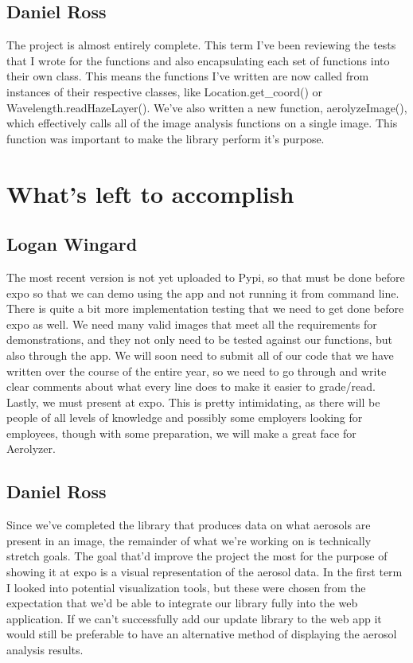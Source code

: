 \documentclass[onecolumn, draftclsnofoot,10pt, compsoc]{IEEEtran}
\begin{document}
\begin{singlespace}
		\subsection{Daniel Ross}
			The project is almost entirely complete.
			This term I've been reviewing the tests that I wrote for the functions and also encapsulating each set of functions into their own class.
			This means the functions I've written are now called from instances of their respective classes, like Location.get\_coord() or Wavelength.readHazeLayer().
			We've also written a new function, aerolyzeImage(), which effectively calls all of the image analysis functions on a single image.
			This function was important to make the library perform it's purpose.
			
			
	\section{What's left to accomplish}
		
		\subsection{Logan Wingard}
			The most recent version is not yet uploaded to Pypi, so that must be done before expo so that we can demo using the app and not running it from command line.
			There is quite a bit more implementation testing that we need to get done before expo as well.
			We need many valid images that meet all the requirements for demonstrations, and they not only need to be tested against our functions, but also through the app.
			We will soon need to submit all of our code that we have written over the course of the entire year, so we need to go through and write clear comments about what every line does to make it easier to grade/read.
			Lastly, we must present at expo.
			This is pretty intimidating, as there will be people of all levels of knowledge and possibly some employers looking for employees, though with some preparation, we will make a great face for Aerolyzer.
		\subsection{Daniel Ross}
			Since we've completed the library that produces data on what aerosols are present in an image, the remainder of what we're working on is technically stretch goals.
			The goal that'd improve the project the most for the purpose of showing it at expo is a visual representation of the aerosol data.
			In the first term I looked into potential visualization tools, but these were chosen from the expectation that we'd be able to integrate our library fully into the web application.
			If we can't successfully add our update library to the web app it would still be preferable to have an alternative method of displaying the aerosol analysis results.



\end{singlespace}
\end{document}
